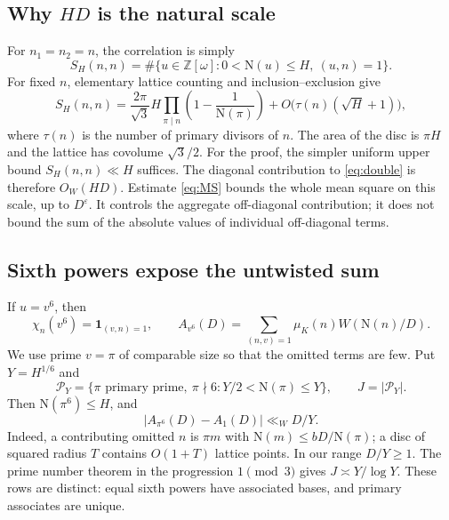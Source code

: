 \documentclass[11pt]{article}
\newcommand{\OO}{\mathbb Z[\omega]}
\newcommand{\N}{\mathrm N}
\newcommand{\muk}{\mu_K}
\newcommand{\ind}{\mathbf 1}
\numberwithin{equation}{section}
\begin{document}
\subsection{Why \texorpdfstring{$HD$}{HD} is the natural scale}
For $n_1=n_2=n$, the correlation is simply
\begin{equation}\label{eq:diagcount}
 S_H(n,n)=\#\{u\in\OO:0<\N(u)\le H,\ (u,n)=1\}.
\end{equation}
For fixed $n$, elementary lattice counting and inclusion--exclusion give
\begin{equation}\label{eq:diagasym}
 S_H(n,n)=\frac{2\pi}{\sqrt3}H
 \prod_{\pi\mid n}\left(1-\frac1{\N(\pi)}\right)
 +O\bigl(\tau(n)(\sqrt H+1)\bigr),
\end{equation}
where $\tau(n)$ is the number of primary divisors of $n$. The area of the
disc is $\pi H$ and the lattice has covolume $\sqrt3/2$.
For the proof, the simpler uniform upper bound $S_H(n,n)\ll H$ suffices.
The diagonal contribution to \eqref{eq:double} is therefore $O_W(HD)$.
Estimate \eqref{eq:MS} bounds the whole mean square on this scale, up to
$D^\varepsilon$. It controls the aggregate off-diagonal contribution;
it does not bound the sum of the absolute values of individual
off-diagonal terms.

\subsection{Sixth powers expose the untwisted sum}
If $u=v^6$, then
\begin{equation}\label{eq:sixthpower}
 \chi_n(v^6)=\ind_{(v,n)=1},\qquad
 A_{v^6}(D)=\sum_{(n,v)=1}\muk(n)W(\N(n)/D).
\end{equation}
We use prime $v=\pi$ of comparable size so that the omitted terms are few.
Put $Y=H^{1/6}$ and
\begin{equation}\label{eq:PY}
 \mathcal P_Y=\{\pi\text{ primary prime},\ \pi\nmid6:
                         Y/2<\N(\pi)\le Y\},\qquad J=|\mathcal P_Y|.
\end{equation}
Then $\N(\pi^6)\le H$, and
\begin{equation}\label{eq:primeerror}
 |A_{\pi^6}(D)-A_1(D)|\ll_W D/Y.
\end{equation}
Indeed, a contributing omitted $n$ is $\pi m$ with
$\N(m)\le bD/\N(\pi)$; a disc of squared radius $T$ contains $O(1+T)$
lattice points. In our range $D/Y\ge1$.
The prime number theorem in the progression $1\pmod3$ gives
$J\asymp Y/\log Y$. These rows are distinct: equal sixth powers have
associated bases, and primary associates are unique.
\end{document}
